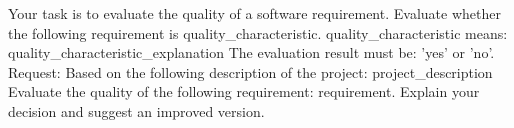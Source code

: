 \begin{plain}
Your task is to evaluate the quality of a
software requirement.
Evaluate whether the following requirement is
{quality_characteristic}.
{quality_characteristic} means:
{quality_characteristic_explanation}
The evaluation result must be: 'yes' or 'no'.
Request: Based on the following description of
the project:
{project_description}
Evaluate the quality of the following
requirement: {requirement}.
Explain your decision and suggest an improved version.
\end{plain}
